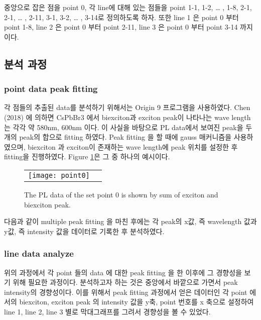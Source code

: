 중앙으로 잡은 점을 point 0, 각 line에 대해 있는 점들을 point 1-1, 1-2, … , 1-8, 2-1, 2-1, … , 2-11, 3-1, 3-2, … , 3-14로 정의하도록 하자. 또한 line 1 은 point 0 부터 point 1-8, line 2 은 point 0 부터 point 2-11, line 3 은 point 0 부터 point 3-14 까지 이다. 

\subsection{분석 과정}
\subsubsection{point data peak fitting}
각 점들의 추출된 data를 분석하기 위해서는 Origin 9 프로그램을 사용하였다. Chen (2018) 에 의하면 CsPbBr3 에서 biexciton과 exciton peak이 나타나는 wave length 는 각각 약 580nm, 600nm 이다\cite{chen2018room}. 이 사실을 바탕으로 PL data에서 보여진 peak을 두개의 peak의 합으로 fitting 하였다. Peak fitting 을 할 때에 gauss 매커니즘을 사용하였으며, biexciton 과 exciton이 존재하는 wave length에 peak 위치를 설정한 후 fitting을 진행하였다. Figure \ref{fig:point0}은 그 중 하나의 예시이다.
\begin{figure}[H]
	\begin{center}
		\begin{tabular}{cc}
			\texttt{[image: point0]}
		\end{tabular}
	\end{center}
	\caption{The PL data of the set point 0 is shown by sum of exciton and biexciton peak.}
	\label{fig:point0}  
\end{figure}
다음과 같이 multiple peak fitting 을 마친 후에는 각 peak의 x값, 즉 wavelength 값과 y값, 즉 intensity 값을 데이터로 기록한 후 분석하였다.
\subsubsection{line data analyze}
위의 과정에서 각 point 들의 data 에 대한 peak fitting 을 한 이후에 그 경향성을 보기 위해 필요한 과정이다. 분석하고자 하는 것은 중앙에서 바깥으로 가면서 peak intensity의 경향성이다. 이를 위해서 peak fitting 과정에서 얻은 데이터인 각 point 에서의 biexciton, exciton peak 의 intensity 값을 y축, point 번호를 x 축으로 설정하여  line 1, line 2, line 3 별로 막대그래프를 그려서 경향성을 볼 수 있었다.
